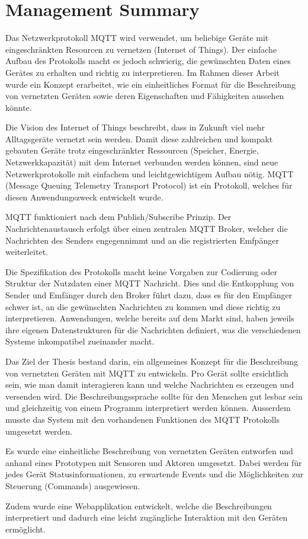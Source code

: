 \chapter*{Management Summary}
\label{chap:managementSummary}

\color{black}

Das Netzwerkprotokoll MQTT wird verwendet, um beliebige Geräte mit eingeschränkten Resourcen zu vernetzen (Internet of Things). Der einfache Aufbau des Protokolls macht es jedoch schwierig, die gewünschten Daten eines Gerätes zu erhalten und richtig zu interpretieren. Im Rahmen dieser Arbeit wurde ein Konzept erarbeitet, wie ein einheitliches Format für die Beschreibung von vernetzten Geräten sowie deren Eigenschaften und Fähigkeiten aussehen könnte.


Die Vision des Internet of Things beschreibt, dass in Zukunft viel mehr Alltagsgeräte vernetzt sein werden. Damit diese zahlreichen und kompakt gebauten Geräte trotz eingeschränkter Ressourcen (Speicher, Energie, Netzwerkkapazität) mit dem Internet verbunden werden können, sind neue Netzwerkprotokolle mit einfachem und leichtgewichtigem Aufbau nötig. MQTT (Message Queuing Telemetry Transport Protocol) ist ein Protokoll, welches für diesen Anwendungszweck entwickelt wurde.

MQTT funktioniert nach dem Publish/Subscribe Prinzip. Der Nachrichtenaustausch erfolgt über einen zentralen MQTT Broker, welcher die Nachrichten des Senders engegennimmt und an die registrierten Emfpänger weiterleitet.


Die Spezifikation des Protokolls macht keine Vorgaben zur Codierung oder Struktur der Nutzdaten einer MQTT Nachricht. Dies und die Entkopplung von Sender und Emfänger durch den Broker führt dazu, dass es für den Empfänger schwer ist, an die gewünschten Nachrichten zu kommen und diese richtig zu interpretieren. 
Anwendungen, welche bereits auf dem Markt sind, haben jeweils ihre eigenen Datenstrukturen für die Nachrichten definiert, was die verschiedenen Systeme inkompatibel zueinander macht.


Das Ziel der Thesis bestand darin, ein allgemeines Konzept für die Beschreibung von vernetzten Geräten mit MQTT zu entwickeln. Pro Gerät sollte ersichtlich sein, wie man damit interagieren kann und welche Nachrichten es erzeugen und versenden wird.
Die Beschreibungssprache sollte für den Menschen gut lesbar sein und gleichzeitig von einem Programm interpretiert werden können.
Ausserdem musste das System mit den vorhandenen Funktionen des MQTT Protokolls umgesetzt werden.


Es wurde eine einheitliche Beschreibung von vernetzten Geräten entworfen und anhand eines Prototypen mit Sensoren und Aktoren umgesetzt.
Dabei werden für jedes Gerät Statusinformationen, zu erwartende Events und die Möglichkeiten zur Steuerung (Commands) ausgewiesen.

Zudem wurde eine Webapplikation entwickelt, welche die Beschreibungen interpretiert und dadurch eine leicht zugängliche Interaktion mit den Geräten ermöglicht.